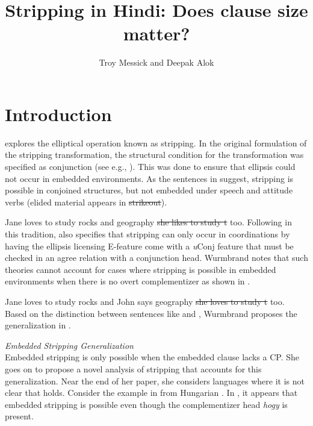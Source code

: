 \documentclass[output=paper]{langscibook}
\author{Troy Messick\orcid{0000-0002-1453-5212}\affiliation{Rutgers University} and Deepak Alok\affiliation{Panligua Language Processing}}
\title{Stripping in Hindi: Does clause size matter?}
\begin{document}
\maketitle

\section{Introduction}
\cite{wurmbrand17} explores the elliptical operation known as stripping. In the original formulation of the stripping transformation, the structural condition for the transformation was specified as conjunction (see e.g.,  \citealt{hankamer79}). This was done to ensure that ellipsis could not occur in embedded environments. As the sentences in  suggest, stripping is possible in conjoined structures, but not embedded under speech and attitude verbs (elided material appears in \sout{strikeout}).

\ea \label{maex1}
    \ea \label{maex1:a}Jane loves to study rocks and geography \sout{she likes to study t} too.
    \z 
\z 
Following in this tradition, \cite{merchant03} also specifies that stripping can only occur in coordinations by having the ellipsis licensing E-feature come with a \emph{u}Conj feature that must be checked in an agree relation with a conjunction head. Wurmbrand notes that such theories cannot account for cases where stripping is possible in embedded environments when there is no overt complementizer as shown in .

\ea \label{maex2}
    Jane loves to study rocks and John says geography \sout{she loves to study t} too.
\z
Based on the distinction between sentences like  and , Wurmbrand proposes the generalization in .

\ea \label{maex3}
    \emph{Embedded Stripping Generalization}\\
    Embedded stripping is only possible when the embedded clause lacks a CP. 
\z
She goes on to propose a novel analysis of stripping that accounts for this generalization. Near the end of her paper, she considers languages where it is not clear that  holds. Consider the example in  from Hungarian \citep{craenenbroeck06,craenenbroeck08,craenenbroeck13}. In , it appears that embedded stripping is possible even though the complementizer head \emph{hogy} is present.
\end{document}
